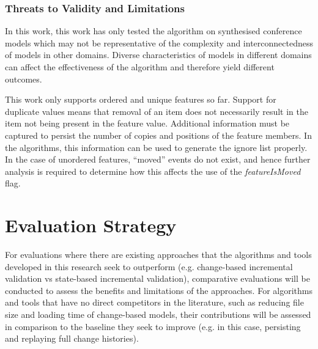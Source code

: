 \documentclass[12pt, a4paper]{report} \usepackage[titletoc]{appendix}
\begin{document}
\subsubsection{Threats to Validity and Limitations}
\label{sec:limitations_and_future_work}
In this work, this work has only tested the algorithm on synthesised conference models which may not be representative of the complexity and interconnectedness of models in other domains. Diverse characteristics of models in different domains can affect the effectiveness of the algorithm and therefore yield different outcomes. 

This work only supports ordered and unique features so far. Support for duplicate values means that removal of an item does not necessarily result in the item not being present in the feature value. Additional information must be captured to persist the number of copies and positions of the feature members. In the algorithms, this information can be used to generate the ignore list properly. In the case of unordered features, ``moved'' events do not exist, and hence further analysis is required to determine how this affects the use of the \emph{featureIsMoved} flag. 

\section{Evaluation Strategy}
\label{sec:evaluation_strategy}
For evaluations where there are existing approaches that the algorithms and tools developed in this research seek to outperform (e.g. change-based incremental validation vs state-based incremental validation), comparative evaluations will be conducted to assess the benefits and limitations of the approaches. For algorithms and tools that have no direct competitors in the literature, such as reducing file size and loading time of change-based models, their contributions will be assessed in comparison to the baseline they seek to improve (e.g. in this case, persisting and replaying full change histories).  
\end{document}
